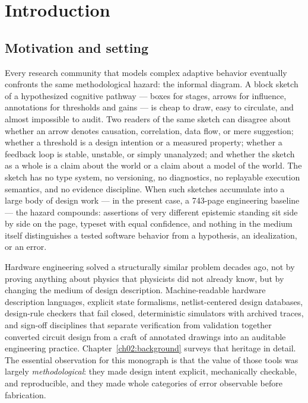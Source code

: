 \chapter{Introduction}\label{ch01:introduction}

\section{Motivation and setting}\label{ch01:motivation}

Every research community that models complex adaptive behavior eventually
confronts the same methodological hazard: the informal diagram. A block sketch
of a hypothesized cognitive pathway --- boxes for stages, arrows for influence,
annotations for thresholds and gains --- is cheap to draw, easy to circulate,
and almost impossible to audit. Two readers of the same sketch can disagree
about whether an arrow denotes causation, correlation, data flow, or mere
suggestion; whether a threshold is a design intention or a measured property;
whether a feedback loop is stable, unstable, or simply unanalyzed; and whether
the sketch as a whole is a claim about the world or a claim about a model of
the world. The sketch has no type system, no versioning, no diagnostics, no
replayable execution semantics, and no evidence discipline. When such sketches
accumulate into a large body of design work --- in the present case, a
743-page engineering baseline --- the hazard compounds: assertions of very
different epistemic standing sit side by side on the page, typeset with equal
confidence, and nothing in the medium itself distinguishes a tested software
behavior from a hypothesis, an idealization, or an error.

Hardware engineering solved a structurally similar problem decades ago, not by
proving anything about physics that physicists did not already know, but by
changing the medium of design description. Machine-readable hardware
description languages, explicit state formalisms, netlist-centered design
databases, design-rule checkers that fail closed, deterministic simulators
with archived traces, and sign-off disciplines that separate verification from
validation together converted circuit design from a craft of annotated
drawings into an auditable engineering practice. Chapter~\ref{ch02:background}
surveys that heritage in detail. The essential observation for this monograph
is that the value of those tools was largely \emph{methodological}: they made
design intent explicit, mechanically checkable, and reproducible, and they
made whole categories of error observable before fabrication.

